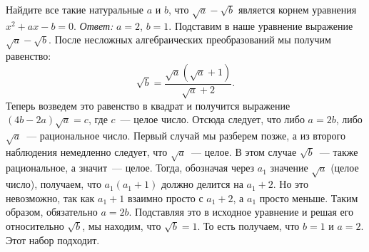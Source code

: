 \problem
Найдите все такие натуральные $a$ и $b$, что $\sqrt{a} - \sqrt{b}$ является
корнем уравнения $x^2 + a x - b = 0$.
\solution
\emph{Ответ:} $a = 2$, $b = 1$.
Подставим в наше уравнение выражение $\sqrt{a} - \sqrt{b}$.
После несложных алгебраических преобразований мы получим равенство: 
\[
    \sqrt{b}
=
    \frac{\sqrt{a}(\sqrt{a} + 1)}{\sqrt{a} + 2}
.\]
Теперь возведем это равенство в квадрат и получится выражение
$(4 b - 2 a) \sqrt{a} = c$, где $c$~--- целое число.
Отсюда следует, что либо $a = 2 b$, либо $\sqrt{a}$~--- рациональное число.
Первый случай мы разберем позже, а из второго наблюдения немедленно следует,
что $\sqrt{a}$~--- целое.
В этом случае $\sqrt{b}$~--- также рациональное, а значит~--- целое.
Тогда, обозначая через $a_1$ значение $\sqrt{a}$ (целое число), получаем, что
$a_1 (a_1 + 1)$ должно делится на $a_1 + 2$.
Но это невозможно, так как $a_1 + 1$ взаимно просто с $a_1 + 2$, а $a_1$ просто
меньше.
Таким образом, обязательно $a = 2 b$.
Подставляя это в исходное уравнение и решая его относительно $\sqrt{b}$, мы
находим, что $\sqrt{b} = 1$.
То есть получаем, что $b = 1$ и $a = 2$.
Этот набор подходит.
\endproblem
